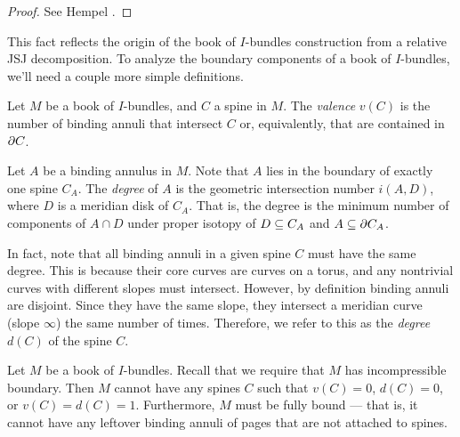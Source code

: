 \begin{proof}

See Hempel \cite[Theorem 10.5]{He}.

\end{proof}

This fact reflects the origin of the book of $I$-bundles construction from
a relative JSJ decomposition. To analyze the boundary components of a book of
$I$-bundles, we'll need a couple more simple definitions.

\begin{defn}

Let $M$ be a book of $I$-bundles, and $C$ a spine in $M$.  The \emph{valence}
$v(C)$ is the number of binding annuli that intersect $C$ or, equivalently,
that are contained in $\partial C$.

Let $A$ be a binding annulus in $M$. Note that $A$ lies in the boundary of
exactly one spine $C_A$. The \emph{degree} of $A$ is the geometric intersection
number $i(A,D)$, where $D$ is a meridian disk of $C_A$. That is, the degree is
the minimum number of components of $A \cap D$ under proper isotopy of $D \subseteq
C_A$ and $A \subseteq \partial C_A$.

In fact, note that all binding annuli in a given spine $C$ must have the same
degree. This is because their core curves are curves on a torus, and any
nontrivial curves with different slopes must intersect. However, by definition
binding annuli are disjoint. Since they have the same slope, they intersect
a meridian curve (slope $\infty$) the same number of times.  Therefore, we
refer to this as the \emph{degree} $d(C)$ of the spine $C$.

\end{defn}

\begin{prop}\label{P:1ptcap}

Let $M$ be a book of $I$-bundles. Recall that we require that $M$ has
incompressible boundary. Then $M$ cannot have any spines $C$ such that
$v(C)=0$, $d(C)=0$, or $v(C)=d(C)=1$. Furthermore, $M$ must be fully bound ---
that is, it cannot have any leftover binding annuli of pages that are not
attached to spines.

\end{prop}

